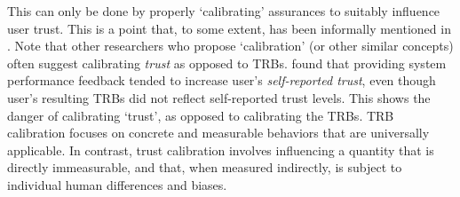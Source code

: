 This can only be done by properly `calibrating' assurances to suitably influence user trust. This is a point that, to some extent, has been informally mentioned in \cite{Muir1994-ow,Muir1987-mk,Lillard2016-yg,Lee2004-pv,Hutchins2015-if}. 
%
Note that other researchers who propose `calibration' (or other similar concepts) often suggest calibrating \emph{trust} as opposed to TRBs. \citet{Dzindolet2003-ts} found that providing system performance feedback tended to increase user's \textit{self-reported trust}, even though user's resulting TRBs did not reflect self-reported trust levels. This shows the danger of calibrating `trust', as opposed to calibrating the TRBs. TRB calibration focuses on concrete and measurable behaviors that are universally applicable. In contrast, trust calibration involves influencing a quantity that is directly immeasurable, and that, when measured indirectly, is subject to individual human differences and biases. %

